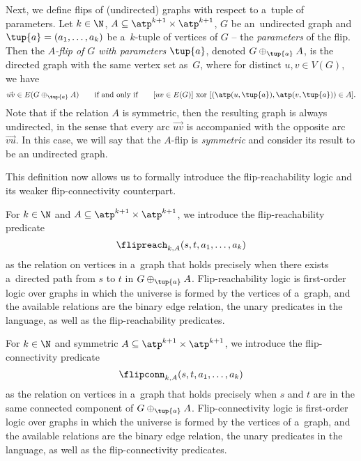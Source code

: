 Next, we define flips of (undirected) graphs with respect to a~tuple of parameters.
Let $k \in \N$, $A \subseteq \atp^{k+1} \times \atp^{k+1}$, $G$ be an~undirected graph and $\tup{a} = (a_1, \ldots, a_k)$ be a~$k$-tuple of vertices of $G$ -- the \emph{parameters} of the flip.
Then the \emph{$A$-flip of $G$ with parameters $\tup{a}$}, denoted $G \oplus_{\tup{a}} A$, is the directed graph with the same vertex set as~$G$, where for distinct $u, v \in V(G)$, we have
\[
    \vec{uv} \in E(G \oplus_{\tup{a}} A)\qquad\textrm{if and only if}\qquad[uv \in E(G)]\ \textrm{xor}\ [(\atp(u, \tup{a}), \atp(v, \tup{a})) \in A].
\]
Note that if the relation $A$ is symmetric, then the resulting graph is always undirected, in the sense that every arc $\vec{uv}$ is accompanied with the opposite arc $\vec{vu}$.
In this case, we will say that the $A$-flip is \emph{symmetric} and consider its result to be an undirected graph.

This definition now allows us to formally introduce the flip-reachability logic and its weaker flip-connectivity counterpart.

\begin{definition}
    For $k \in \N$ and $A \subseteq \atp^{k+1} \times \atp^{k+1}$, we introduce the flip-reachability predicate
    \[
        \flipreach_{k, A}(s, t, a_1, \ldots, a_k)
    \]
    as the relation on vertices in a~graph that holds precisely when there exists a~directed path from $s$ to $t$ in $G \oplus_{\tup{a}} A$.
    Flip-reachability logic is first-order logic over graphs in which the universe is formed by the vertices of a~graph, and the available relations are the binary edge relation, the unary predicates in the language, as well as the flip-reachability predicates.
\end{definition}

\begin{definition}
    For $k \in \N$ and symmetric $A \subseteq \atp^{k+1} \times \atp^{k+1}$, we introduce the flip-connectivity predicate
    \[
        \flipconn_{k, A}(s, t, a_1, \ldots, a_k)
    \]
    as the relation on vertices in a~graph that holds precisely when $s$ and $t$ are in the same connected component of $G \oplus_{\tup{a}} A$.
    Flip-connectivity logic is first-order logic over graphs in which the universe is formed by the vertices of a~graph, and the available relations are the binary edge relation, the unary predicates in the language, as well as the flip-connectivity predicates.
\end{definition}

